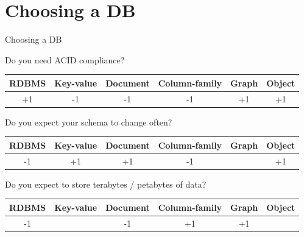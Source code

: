 \documentclass{beamer}
\begin{document}
\section{Choosing a DB}

\begin{frame}{Choosing a DB}

Do you need ACID compliance?

{\small
\begin{center}
\begin{tabular}{c|c|c|c|c|c}
RDBMS & Key-value & Document & Column-family & Graph & Object \\
\hline
+1 & -1 & -1 & -1 & +1 & +1
\end{tabular}
\end{center}
}

Do you expect your schema to change often?

{\small
\begin{center}
\begin{tabular}{c|c|c|c|c|c}
RDBMS & Key-value & Document & Column-family & Graph & Object \\
\hline
-1 & +1 & +1 & -1 & & +1 \\
\end{tabular}
\end{center}
}

Do you expect to store terabytes / petabytes of data?

{\small
\begin{center}
\begin{tabular}{c|c|c|c|c|c}
RDBMS & Key-value & Document & Column-family & Graph & Object \\
\hline
-1 &  & -1 & +1 & +1 & \\
\end{tabular}
\end{center}
}

\end{frame}
\end{document}

